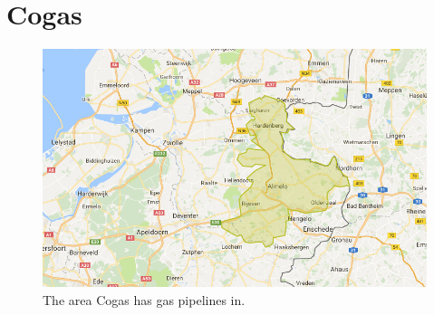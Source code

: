 \section{Cogas}

\begin{figure}[!htb]
\centering
\includegraphics[width=.75\textwidth]{./figures/introduction/cogas_area.png}
\caption{The area Cogas has gas pipelines in.}
\label{fig:intro:cogas-area}
\end{figure}


